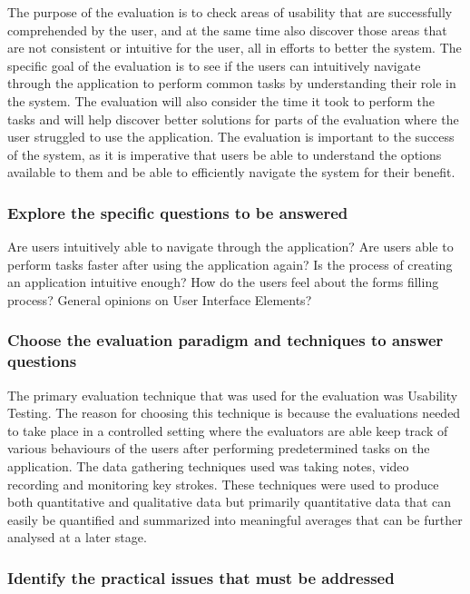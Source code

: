 \documentclass[12pt]{article}
\begin{document}
\begin{flushleft}
The purpose of the evaluation is to check areas of usability that are successfully comprehended by the user, and at the same time also discover those areas that are not consistent or intuitive for the user, all in efforts to better the system. The specific goal of the evaluation is to see if the users can intuitively navigate through the application to perform common tasks by understanding their role in the system. The evaluation will also consider the time it took to perform the tasks and will help discover better solutions for parts of the evaluation where the user struggled to use the application. The evaluation is important to the success of the system, as it is imperative that users be able to understand the options available to them and be able to efficiently navigate the system for their benefit. 

\subsubsection{Explore the specific questions to be answered}

Are users intuitively able to navigate through the application?
Are users able to perform tasks faster after using the application again?
Is the process of creating an application intuitive enough?
How do the users feel about the forms filling process?
General opinions on User Interface Elements?

\subsubsection{Choose the evaluation paradigm and techniques to answer questions}

The primary evaluation technique that was used for the evaluation was Usability Testing. The reason for choosing this technique is because the evaluations needed to take place in a controlled setting where the evaluators are able keep track of various behaviours of the users after performing predetermined tasks on the application.
The data gathering techniques used was taking notes, video recording and monitoring key strokes. These techniques were used to produce both quantitative and qualitative data but primarily quantitative data that can easily be quantified and summarized into meaningful averages that can be further analysed at a later stage.

\subsubsection{Identify the practical issues that must be addressed}
\begin{enumerate}


\end{enumerate}
\end{flushleft}
\end{document}
